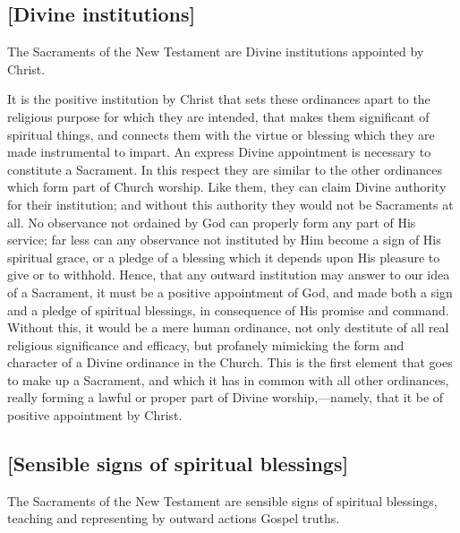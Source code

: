 \documentclass[
  english,
]{book}
\begin{document}

\hypertarget{divine-institutions}{%
\subsection{{[}Divine institutions{]}}\label{divine-institutions}}

The Sacraments of the New Testament are Divine institutions appointed by Christ.

It is the positive institution by Christ that sets these ordinances apart to the religious purpose for which they are intended, that makes them significant of spiritual things, and connects them with the virtue or blessing which they are made instrumental to impart. An express Divine appointment is necessary to constitute a Sacrament. In this respect they are similar to the other ordinances which form part of Church worship. Like them, they can claim Divine authority for their institution; and without this authority they would not be Sacraments at all. No observance not ordained by God can properly form any part of His service; far less can any observance not instituted by Him become a sign of His spiritual grace, or a pledge of a blessing which it depends upon His pleasure to give or to withhold. Hence, that any outward institution may answer to our idea of a Sacrament, it must be a positive appointment of God, and made both a sign and a pledge of spiritual blessings, in consequence of His promise and command. Without this, it would be a mere human ordinance, not only destitute of all real religious significance and efficacy, but profanely mimicking the form and character of a Divine ordinance in the Church. This is the first element that goes to make up a Sacrament, and which it has in common with all other ordinances, really forming a lawful or proper part of Divine worship,---namely, that it be of positive appointment by Christ.

\hypertarget{sensible-signs-of-spiritual-blessings}{%
\subsection{{[}Sensible signs of spiritual blessings{]}}\label{sensible-signs-of-spiritual-blessings}}

The Sacraments of the New Testament are sensible signs of spiritual blessings, teaching and representing by outward actions Gospel truths.
\end{document}
